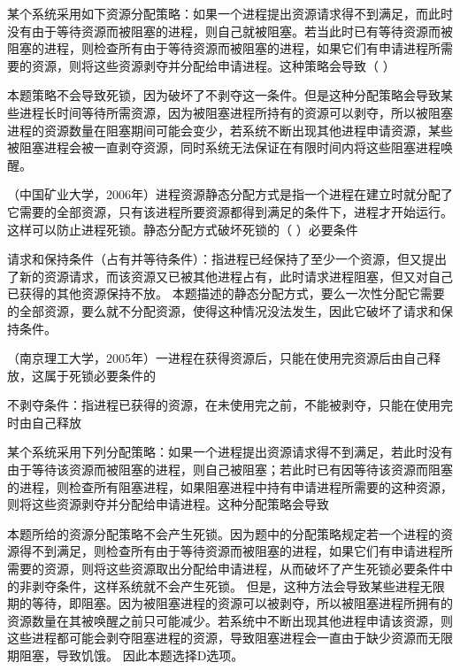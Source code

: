 \question 某个系统采用如下资源分配策略：如果一个进程提出资源请求得不到满足，而此时没有由于等待资源而被阻塞的进程，则自己就被阻塞。若当此时已有等待资源而被阻塞的进程，则检查所有由于等待资源而被阻塞的进程，如果它们有申请进程所需要的资源，则将这些资源剥夺并分配给申请进程。这种策略会导致（
）
\par{}
\begin{solution}本题策略不会导致死锁，因为破坏了不剥夺这一条件。但是这种分配策略会导致某些进程长时间等待所需资源，因为被阻塞进程所持有的资源可以剥夺，所以被阻塞进程的资源数量在阻塞期间可能会变少，若系统不断出现其他进程申请资源，某些被阻塞进程会被一直剥夺资源，同时系统无法保证在有限时间内将这些阻塞进程唤醒。
\end{solution}
\question （中国矿业大学，2006年）进程资源静态分配方式是指一个进程在建立时就分配了它需要的全部资源，只有该进程所要资源都得到满足的条件下，进程才开始运行。这样可以防止进程死锁。静态分配方式破坏死锁的（
）必要条件
\par{}
\begin{solution}请求和保持条件（占有并等待条件）：指进程已经保持了至少一个资源，但又提出了新的资源请求，而该资源又已被其他进程占有，此时请求进程阻塞，但又对自己已获得的其他资源保持不放。
本题描述的静态分配方式，要么一次性分配它需要的全部资源，要么就不分配资源，使得这种情况没法发生，因此它破坏了请求和保持条件。
\end{solution}
\question （南京理工大学，2005年）一进程在获得资源后，只能在使用完资源后由自己释放，这属于死锁必要条件的
\par{}
\begin{solution}不剥夺条件：指进程已获得的资源，在未使用完之前，不能被剥夺，只能在使用完时由自己释放
\end{solution}
\question 某个系统采用下列分配策略：如果一个进程提出资源请求得不到满足，若此时没有由于等待该资源而被阻塞的进程，则自己被阻塞；若此时已有因等待该资源而阻塞的进程，则检查所有阻塞进程，如果阻塞进程中持有申请进程所需要的这种资源，则将这些资源剥夺并分配给申请进程。这种分配策略会导致
\par{}
\begin{solution}本题所给的资源分配策略不会产生死锁。因为题中的分配策略规定若一个进程的资源得不到满足，则检查所有由于等待资源而被阻塞的进程，如果它们有申请进程所需要的资源，则将这些资源取出分配给申请进程，从而破坏了产生死锁必要条件中的非剥夺条件，这样系统就不会产生死锁。
但是，这种方法会导致某些进程无限期的等待，即阻塞。因为被阻塞进程的资源可以被剥夺，所以被阻塞进程所拥有的资源数量在其被唤醒之前只可能减少。若系统中不断出现其他进程申请该资源，则这些进程都可能会剥夺阻塞进程的资源，导致阻塞进程会一直由于缺少资源而无限期阻塞，导致饥饿。
因此本题选择D选项。
\end{solution}
